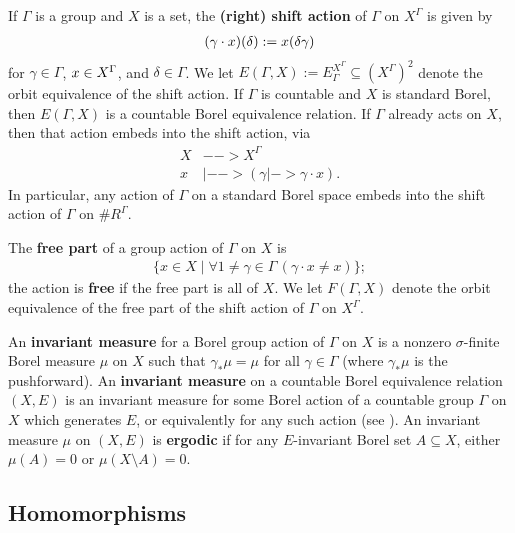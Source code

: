 \documentclass[11pt]{article}
\newcommand*\defn{\textbf}
\begin{document}
If $\Gamma$ is a group and $X$ is a set, the \defn{(right) shift action} of $\Gamma$ on $X^\Gamma$ is given by
\begin{align*}
(\gamma \cdot \-x)(\delta) := \-x(\delta \gamma)
\end{align*}
for $\gamma \in \Gamma$, $\-x \in X^\Gamma$, and $\delta \in \Gamma$.  We let $E(\Gamma, X) := E_\Gamma^{X^\Gamma} \subseteq (X^\Gamma)^2$ denote the orbit equivalence of the shift action.  If $\Gamma$ is countable and $X$ is standard Borel, then $E(\Gamma, X)$ is a countable Borel equivalence relation.  If $\Gamma$ already acts on $X$, then that action embeds into the shift action, via
\begin{align*}
X &--> X^\Gamma \\
x &|--> (\gamma |-> \gamma \cdot x).
\end{align*}
In particular, any action of $\Gamma$ on a standard Borel space embeds into the shift action of $\Gamma$ on $\#R^\Gamma$.

The \defn{free part} of a group action of $\Gamma$ on $X$ is
\begin{align*}
\{x \in X \mid \forall 1 \ne \gamma \in \Gamma\, (\gamma \cdot x \ne x)\};
\end{align*}
the action is \defn{free} if the free part is all of $X$.  We let $F(\Gamma, X)$ denote the orbit equivalence of the free part of the shift action of $\Gamma$ on $X^\Gamma$.

An \defn{invariant measure} for a Borel group action of $\Gamma$ on $X$ is a nonzero $\sigma$-finite Borel measure $\mu$ on $X$ such that $\gamma_* \mu = \mu$ for all $\gamma \in \Gamma$ (where $\gamma_* \mu$ is the pushforward).  An \defn{invariant measure} on a countable Borel equivalence relation $(X, E)$ is an invariant measure for some Borel action of a countable group $\Gamma$ on $X$ which generates $E$, or equivalently for any such action (see \cite[2.1]{KM}).  An invariant measure $\mu$ on $(X, E)$ is \defn{ergodic} if for any $E$-invariant Borel set $A \subseteq X$, either $\mu(A) = 0$ or $\mu(X \setminus A) = 0$.

\subsection{Homomorphisms}
\label{sec:homoms}
\end{document}
